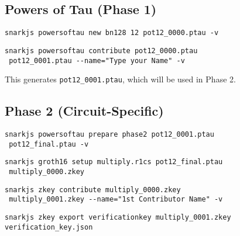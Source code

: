 \documentclass{article}
\begin{document}
	\subsection*{Powers of Tau (Phase 1)}
	
	\begin{tcolorbox}[title=Start the Ceremony]
		\begin{lstlisting}
snarkjs powersoftau new bn128 12 pot12_0000.ptau -v
		\end{lstlisting}
	\end{tcolorbox}
	
	\begin{tcolorbox}[title=Contribute to the Ceremony]
		\begin{lstlisting}
snarkjs powersoftau contribute pot12_0000.ptau
 pot12_0001.ptau --name="Type your Name" -v
		\end{lstlisting}
	\end{tcolorbox}
	
	This generates \texttt{pot12\_0001.ptau}, which will be used in Phase 2.
	
	\subsection*{Phase 2 (Circuit-Specific)}
	
	\begin{tcolorbox}[title=Prepare Phase 2 File]
		\begin{lstlisting}
snarkjs powersoftau prepare phase2 pot12_0001.ptau
 pot12_final.ptau -v
		\end{lstlisting}
	\end{tcolorbox}
	
	\begin{tcolorbox}[title=Generate zkey File]
		\begin{lstlisting}
snarkjs groth16 setup multiply.r1cs pot12_final.ptau
 multiply_0000.zkey
		\end{lstlisting}
	\end{tcolorbox}
	
	\begin{tcolorbox}[title=Contribute to Phase 2]
		\begin{lstlisting}
snarkjs zkey contribute multiply_0000.zkey
 multiply_0001.zkey --name="1st Contributor Name" -v
		\end{lstlisting}
	\end{tcolorbox}
	
	\begin{tcolorbox}[title=Export Verification Key]
		\begin{lstlisting}
snarkjs zkey export verificationkey multiply_0001.zkey 
verification_key.json
		\end{lstlisting}
	\end{tcolorbox}
\end{document}
